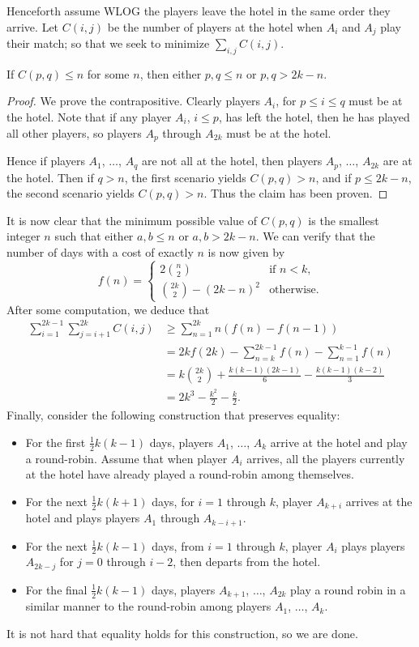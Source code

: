 Henceforth assume WLOG the players leave the hotel in the same order they arrive. Let $C(i,j)$ be the number of players at the hotel when $A_i$ and $A_j$ play their match; so that we seek to minimize $\sum_{i,j}C(i,j)$.
\begin{iclaim}
    If $C(p,q)\le n$ for some $n$, then either $p,q\le n$ or $p,q>2k-n$.
\end{iclaim}
\begin{proof}
    We prove the contrapositive. Clearly players $A_i$, for $p\le i\le q$ must be at the hotel. Note that if any player $A_i$, $i\le p$, has left the hotel, then he has played all other players, so players $A_p$ through $A_{2k}$ must be at the hotel.

    Hence if players $A_1$, $\ldots$, $A_q$ are not all at the hotel, then players $A_p$, $\ldots$, $A_{2k}$ are at the hotel. Then if $q>n$, the first scenario yields $C(p,q)>n$, and if $p\le 2k-n$, the second scenario yields $C(p,q)>n$. Thus the claim has been proven.
\end{proof}

It is now clear that the minimum possible value of $C(p,q)$ is the smallest integer $n$ such that either $a,b\le n$ or $a,b>2k-n$. We can verify that the number of days with a cost of exactly $n$ is now given by \[f(n)=\begin{cases}2\binom n2&\text{if }n<k,\\ \binom{2k}2-(2k-n)^2&\text{otherwise.}\end{cases}\]
After some computation, we deduce that
\begin{align*}
    \sum_{i=1}^{2k-1}\sum_{j=i+1}^{2k}C(i,j)&\ge\sum_{n=1}^{2k}n(f(n)-f(n-1))\\
    &=2kf(2k)-\sum_{n=k}^{2k-1}f(n)-\sum_{n=1}^{k-1}f(n)\\
    &=k\binom{2k}2+\frac{k(k-1)(2k-1)}6-\frac{k(k-1)(k-2)}3\\
    &=2k^3-\frac{k^2}2-\frac k2.
\end{align*}
Finally, consider the following construction that preserves equality:
\begin{itemize}
    \item For the first $\frac12k(k-1)$ days, players $A_1$, $\ldots$, $A_k$ arrive at the hotel and play a round-robin. Assume that when player $A_i$ arrives, all the players currently at the hotel have already played a round-robin among themselves.
    \item For the next $\frac12k(k+1)$ days, for $i=1$ through $k$, player $A_{k+i}$ arrives at the hotel and plays players $A_1$ through $A_{k-i+1}$.
    \item For the next $\frac12k(k-1)$ days, from $i=1$ through $k$, player $A_i$ plays players $A_{2k-j}$ for $j=0$ through $i-2$, then departs from the hotel.
    \item For the final $\frac12k(k-1)$ days, players $A_{k+1}$, $\ldots$, $A_{2k}$ play a round robin in a similar manner to the round-robin among players $A_1$, $\ldots$, $A_k$.
\end{itemize}
It is not hard that equality holds for this construction, so we are done.

